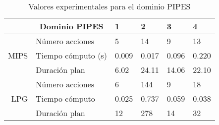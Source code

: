 \documentclass[a4paper]{article}
\begin{document}
\begin{table}[h]
\label{fpipes}
\begin{center}
\begin{tabular}{r|c| l|l|l|l|}
& Dominio PIPES & 1 & 2 & 3 & 4 \\ \hline \hline
\multirow{3}{*}{MIPS} & \multicolumn{1}{l|}{Número acciones} & \multicolumn{1}{l|}{5} & \multicolumn{1}{l|}{14} & \multicolumn{1}{l|}{9} & \multicolumn{1}{l|}{13} \\\cline{2-6}
                     & \multicolumn{1}{l|}{Tiempo cómputo (s)} & \multicolumn{1}{l|}{0.009} & \multicolumn{1}{l|}{0.017} & \multicolumn{1}{l|}{0.096} & \multicolumn{1}{l|}{0.220} \\\cline{2-6}
                     & \multicolumn{1}{l|}{Duración plan} & \multicolumn{1}{l|}{6.02} & \multicolumn{1}{l|}{24.11} & \multicolumn{1}{l|}{14.06} & \multicolumn{1}{l|}{22.10} \\\hline \hline
\multirow{3}{*}{LPG} & \multicolumn{1}{l|}{Número acciones} & \multicolumn{1}{l|}{6} & \multicolumn{1}{l|}{144} & \multicolumn{1}{l|}{9} & \multicolumn{1}{l|}{18} \\\cline{2-6}
                     & \multicolumn{1}{l|}{Tiempo cómputo} & \multicolumn{1}{l|}{0.025} & \multicolumn{1}{l|}{0.737} & \multicolumn{1}{l|}{0.059} & \multicolumn{1}{l|}{0.038} \\\cline{2-6}
                     & \multicolumn{1}{l|}{Duración plan} & \multicolumn{1}{l|}{12} & \multicolumn{1}{l|}{278} & \multicolumn{1}{l|}{14} & \multicolumn{1}{l|}{32} \\\hline
\end{tabular}
\caption{Valores experimentales para el dominio PIPES}
\end{center}
\end{table}
\end{document}
